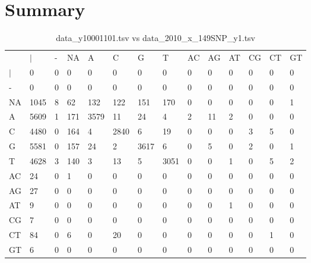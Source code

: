 \section{Summary} \label{section_summary}
\begin{center}
\begin{longtable}{|l|l|l|l|l|l|l|l|l|l|l|l|l|l|}
\caption{data\_y10001101.tsv vs data\_2010\_x\_149SNP\_y1.tsv} \label{table_dm0}\\
\hline
\\
\hline
&$|$&-&NA&A&C&G&T&AC&AG&AT&CG&CT&GT\\
$|$&0&0&0&0&0&0&0&0&0&0&0&0&0\\
-&0&0&0&0&0&0&0&0&0&0&0&0&0\\
NA&1045&8&62&132&122&151&170&0&0&0&0&0&1\\
A&5609&1&171&3579&11&24&4&2&11&2&0&0&0\\
C&4480&0&164&4&2840&6&19&0&0&0&3&5&0\\
G&5581&0&157&24&2&3617&6&0&5&0&2&0&1\\
T&4628&3&140&3&13&5&3051&0&0&1&0&5&2\\
AC&24&0&1&0&0&0&0&0&0&0&0&0&0\\
AG&27&0&0&0&0&0&0&0&0&0&0&0&0\\
AT&9&0&0&0&0&0&0&0&0&1&0&0&0\\
CG&7&0&0&0&0&0&0&0&0&0&0&0&0\\
CT&84&0&6&0&20&0&0&0&0&0&0&1&0\\
GT&6&0&0&0&0&0&0&0&0&0&0&0&0\\
\hline
\end{longtable}
\end{center}

